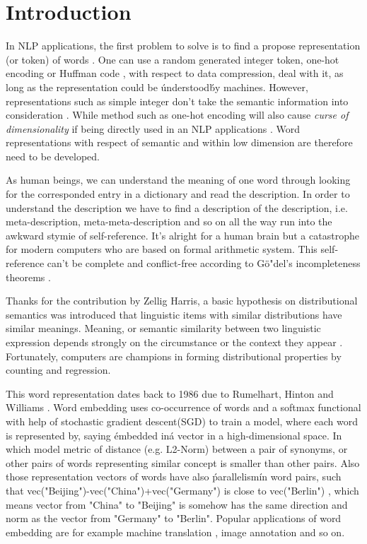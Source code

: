 \section{Introduction}
In NLP applications, the first problem to solve is to find a propose representation (or token) of words \cite{schutze2008introduction}. One can use a random generated integer token, one-hot encoding \cite{turian2010word} or Huffman code \cite{el2006compression}, with respect to data compression, deal with it, as long as the representation could be \'understood\' by machines. However, representations such as simple integer don't take the semantic information into consideration \cite{le2014distributed}. While method such as one-hot encoding will also cause \textit{curse of dimensionality} if being directly used in an NLP applications \cite{bengio2003neural}. Word representations with respect of semantic and within low dimension are therefore need to be developed. 

As human beings, we can understand the meaning of one word through looking for the corresponded entry in a dictionary and read the description. In order to understand the description we have to find a description of the description, i.e. meta-description, meta-meta-description and so on all the way run into the awkward stymie of self-reference. It's alright for a human brain but a catastrophe for modern computers who are based on formal arithmetic system. This self-reference can't be complete and conflict-free according to G{\"o"}del's incompleteness theorems \cite{godel1931formal}.

Thanks for the contribution by Zellig Harris, a basic hypothesis on distributional semantics was introduced that linguistic items with similar distributions have similar meanings. Meaning, or semantic similarity between two linguistic expression depends strongly on the circumstance or the context they appear \cite{harris1954distributional}. Fortunately, computers are champions in forming distributional properties by counting and regression.

This word representation dates back to 1986 due to Rumelhart, Hinton and Williams \cite{williams1986learning}. Word embedding uses co-occurrence of words and a softmax functional with help of stochastic gradient descent(SGD) to train a model, where each word is represented by, saying \'embedded in\' a vector in a high-dimensional space. In which model metric of distance (e.g. L2-Norm) between a pair of synonyms, or other pairs of words representing similar concept is smaller than other pairs. Also those representation vectors of words have also \'parallelism\' in word pairs, such that vec("Beijing")-vec("China")+vec("Germany") is close to vec("Berlin") \cite{le2014distributed}, which means vector from "China" to "Beijing" is somehow has the same direction and norm as the vector from "Germany" to "Berlin". Popular applications of word embedding are for example machine translation \cite{cho2014learning}, image annotation \cite{weston2011wsabie} and so on. 

